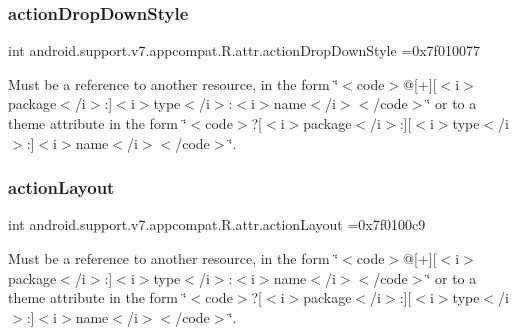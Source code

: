 \subsubsection{\texorpdfstring{action\+Drop\+Down\+Style}{actionDropDownStyle}}
{\footnotesize\ttfamily int android.\+support.\+v7.\+appcompat.\+R.\+attr.\+action\+Drop\+Down\+Style =0x7f010077\hspace{0.3cm}{\ttfamily [static]}}

Must be a reference to another resource, in the form \char`\"{}$<$code$>$@\mbox{[}+\mbox{]}\mbox{[}$<$i$>$package$<$/i$>$\+:\mbox{]}$<$i$>$type$<$/i$>$\+:$<$i$>$name$<$/i$>$$<$/code$>$\char`\"{} or to a theme attribute in the form \char`\"{}$<$code$>$?\mbox{[}$<$i$>$package$<$/i$>$\+:\mbox{]}\mbox{[}$<$i$>$type$<$/i$>$\+:\mbox{]}$<$i$>$name$<$/i$>$$<$/code$>$\char`\"{}. \mbox{\label{classandroid_1_1support_1_1v7_1_1appcompat_1_1R_1_1attr_ad39ae936831dd32921fd3588f0a5150b}} 
\subsubsection{\texorpdfstring{action\+Layout}{actionLayout}}
{\footnotesize\ttfamily int android.\+support.\+v7.\+appcompat.\+R.\+attr.\+action\+Layout =0x7f0100c9\hspace{0.3cm}{\ttfamily [static]}}

Must be a reference to another resource, in the form \char`\"{}$<$code$>$@\mbox{[}+\mbox{]}\mbox{[}$<$i$>$package$<$/i$>$\+:\mbox{]}$<$i$>$type$<$/i$>$\+:$<$i$>$name$<$/i$>$$<$/code$>$\char`\"{} or to a theme attribute in the form \char`\"{}$<$code$>$?\mbox{[}$<$i$>$package$<$/i$>$\+:\mbox{]}\mbox{[}$<$i$>$type$<$/i$>$\+:\mbox{]}$<$i$>$name$<$/i$>$$<$/code$>$\char`\"{}. \mbox{\label{classandroid_1_1support_1_1v7_1_1appcompat_1_1R_1_1attr_a471d001a1c418b85dcaf54b0d910b842}} 
